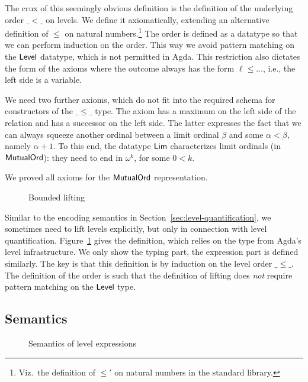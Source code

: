 \documentclass[manuscript,screen,review,anonymous]{acmart}
\begin{document}
\BQBoundedLevel

The crux of this seemingly obvious definition is the definition of the
underlying order $\_<\_$ on levels. We define it axiomatically,
extending an alternative definition of $\le$ on natural
numbers.\footnote{Viz.\ the definition of $\le'$ on natural numbers in
  the standard library.} The order is defined as a datatype so that we
can perform induction on the order. This way we avoid pattern matching
on the $\ALevel$ datatype, which is not permitted in Agda. This
restriction also dictates the form of the axioms where the outcome
always has the form $\ell \le \dots$, i.e., the left side is a variable.

\begin{minipage}{0.45\linewidth}
  \BQLevelLe
  \BQLevelLt
\end{minipage}
\begin{minipage}{0.45\linewidth}
  \BQLim
  \BQAxiomsLe
\end{minipage}

We need two further axioms, which do not fit into the required schema
for constructors of the $\_\le\_$ type. The axiom {\ALeLubLub} has a maximum on
the left side of the relation and {\ALtSucLim} has a successor on the
left side. The latter expresses the fact that we can always squeeze
another ordinal between a limit ordinal $\beta$ and some
$\alpha<\beta$, namely $\alpha+1$. To this end, the datatype $\ALim$
characterizes limit ordinals (in $\AMutualOrd$): they need to end in
$\omega^k$, for some $0<k$.

We proved all axioms for the $\AMutualOrd$ representation.

\begin{figure}[tp]
  \BQBoundedLift
  \caption{Bounded lifting}
  \label{fig:eh-bounded-lifting}
\end{figure}
Similar to the encoding semantics in
Section~\ref{sec:level-quantification}, we sometimes need to lift
levels explicitly, but only in connection with level
quantification. Figure~\ref{fig:eh-bounded-lifting} gives the
definition, which relies on the {\ALift} type from Agda's level
infrastructure. We only show the typing part, the expression part is
defined similarly. The key is that this definition is by induction on
the level order $\_\le\_$. The definition of the order is such that
the definition of lifting does \emph{not} require pattern matching on
the $\ALevel$ type.

\subsection{Semantics}
\label{sec:semantics-1}
\begin{figure}[tp]
  \begin{minipage}[t]{0.45\linewidth}
    \EHLSemFin
  \end{minipage}
  \begin{minipage}[t]{0.45\linewidth}
    \EHLSemAny
  \end{minipage}
  \caption{Semantics of level expressions}
  \label{fig:eh-semantics-level-expressions}
\end{figure}
\end{document}
